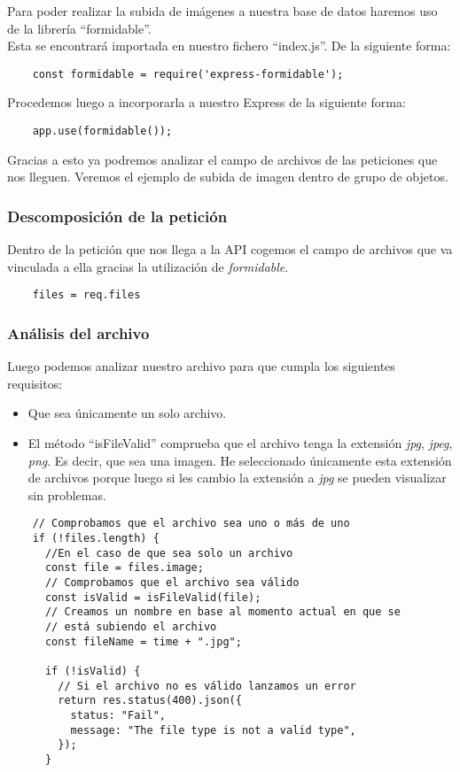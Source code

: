 Para poder realizar la subida de imágenes a nuestra base de datos haremos uso de la librería ``formidable''.
\\Esta se encontrará importada en nuestro fichero ``index.js''. De la siguiente forma:

\begin{verbatim}
    const formidable = require('express-formidable');
\end{verbatim}

Procedemos luego a incorporarla a nuestro Express de la siguiente forma:

\begin{verbatim}
    app.use(formidable());
\end{verbatim}

Gracias a esto ya podremos analizar el campo de archivos de las peticiones que nos lleguen. Veremos el ejemplo de subida de imagen dentro de grupo de objetos.

\subsubsection{Descomposición de la petición}
Dentro de la petición que nos llega a la API cogemos el campo de archivos que va vinculada a ella gracias la utilización de \textit{formidable}.
\begin{verbatim}
    files = req.files
\end{verbatim}

\subsubsection{Análisis del archivo}
Luego podemos analizar nuestro archivo para que cumpla los siguientes requisitos:
\begin{itemize}
    \item Que sea únicamente un solo archivo.
    \item El método ``isFileValid'' comprueba que el archivo tenga la extensión \textit{jpg}, \textit{jpeg}, \textit{png}. Es decir, que sea una imagen. He seleccionado únicamente esta extensión de archivos porque luego si les cambio la extensión a \textit{jpg} se pueden visualizar sin problemas.
\end{itemize}

\begin{verbatim}
    // Comprobamos que el archivo sea uno o más de uno
    if (!files.length) {
      //En el caso de que sea solo un archivo
      const file = files.image;
      // Comprobamos que el archivo sea válido
      const isValid = isFileValid(file);
      // Creamos un nombre en base al momento actual en que se
      // está subiendo el archivo
      const fileName = time + ".jpg";

      if (!isValid) {
        // Si el archivo no es válido lanzamos un error
        return res.status(400).json({
          status: "Fail",
          message: "The file type is not a valid type",
        });
      }
\end{verbatim}

